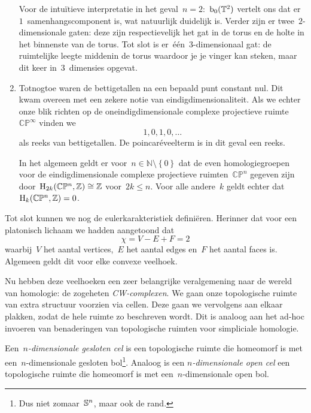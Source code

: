 \documentclass[a4paper,11pt,openany,oneside,article]{memoir}
\begin{document}
\begin{example}
\begin{enumerate}
      Voor de intu\"itieve interpretatie in het geval~$n=2$:~$\mathrm{b}_0(\mathbb{T}^2)$ vertelt ons dat er~$1$~samenhangscomponent is, wat natuurlijk duidelijk is. Verder zijn er twee~$2$\nobreakdash-dimensionale gaten: deze zijn respectievelijk het gat in de torus en de holte in het binnenste van de torus. Tot slot is er~\'e\'en~$3$\nobreakdash-dimensionaal gat: de ruimtelijke leegte middenin de torus waardoor je je vinger kan steken, maar dit keer in~$3$~dimensies opgevat.
      
    \item Totnogtoe waren de bettigetallen na een bepaald punt constant nul. Dit kwam overeen met een zekere notie van eindigdimensionaliteit. Als we echter onze blik richten op de oneindigdimensionale complexe projectieve ruimte~$\mathbb{C}\mathbb{P}^{\infty}$ vinden we
      \begin{equation}
        1,0,1,0,\ldots
      \end{equation}
      als reeks van bettigetallen. De poincar\'eveelterm is in dit geval een reeks.

      In het algemeen geldt er voor~$n\in\mathbb{N}\setminus\left\{ 0 \right\}$ dat de even homologiegroepen voor de eindigdimensionale complexe projectieve ruimten~$\mathbb{C}\mathbb{P}^n$ gegeven zijn door~$\mathrm{H}_{2k}(\mathbb{C}\mathbb{P}^n,\mathbb{Z})\cong\mathbb{Z}$ voor~$2k\leq n$. Voor alle andere~$k$ geldt echter dat~$\mathrm{H}_{k}(\mathbb{C}\mathbb{P}^n,\mathbb{Z})=0$.
  \end{enumerate}
\end{example}

Tot slot kunnen we nog de eulerkarakteristiek defini\"eren. Herinner dat voor een platonisch lichaam we hadden aangetoond dat
\begin{equation}
  \chi=V-E+F=2
\end{equation}
waarbij~$V$ het aantal vertices,~$E$ het aantal edges en~$F$ het aantal faces is. Algemeen geldt dit voor elke convexe veelhoek.

Nu hebben deze veelhoeken een zeer belangrijke veralgemening naar de wereld van homologie: de zogeheten \emph{CW\nobreakdash-complexen}. We gaan onze topologische ruimte van extra structuur voorzien via cellen. Deze gaan we vervolgens aan elkaar plakken, zodat de hele ruimte zo beschreven wordt. Dit is analoog aan het ad-hoc invoeren van benaderingen van topologische ruimten voor simpliciale homologie.

\begin{definition}
  Een~\emph{$n$-dimensionale gesloten cel} is een topologische ruimte die homeomorf is met een~$n$-dimensionale gesloten bol\footnote{Dus niet zomaar~$\mathbb{S}^n$, maar ook de rand.}. Analoog is een \emph{$n$\nobreakdash-dimensionale open cel} een topologische ruimte die homeomorf is met een~$n$-dimensionale open bol.
\end{definition}
\end{document}
